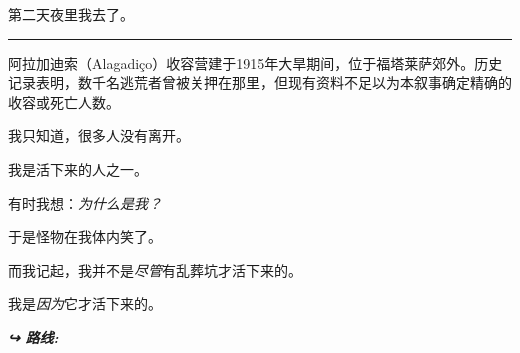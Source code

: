 \noindent 第二天夜里我去了。

\vspace{0.5em}\noindent\rule{\textwidth}{0.5pt}\vspace{0.5em}

\noindent 阿拉加迪索（Alagadiço）收容营建于1915年大旱期间，位于福塔莱萨郊外。历史记录表明，数千名逃荒者曾被关押在那里，但现有资料不足以为本叙事确定精确的收容或死亡人数。

\noindent 我只知道，很多人没有离开。

\noindent 我是活下来的人之一。

\noindent 有时我想：\textit{为什么是我？}

\noindent 于是怪物在我体内笑了。

\noindent 而我记起，我并不是\textit{尽管}有乱葬坑才活下来的。

\noindent 我是\textit{因为}它才活下来的。

\vspace{0.5em}
\noindent\textit{\textbf{↪ 路线:}  \rotasep {}}
